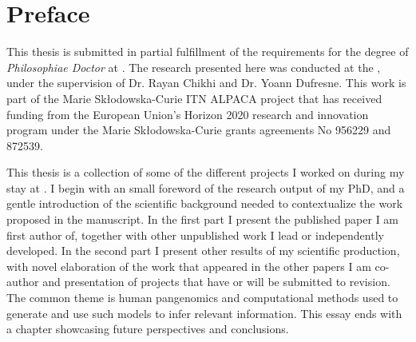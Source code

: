 \chapter{Preface}
This thesis is submitted in partial fulfillment of the requirements for the degree of \emph{Philosophiae Doctor} at \sorbonne.
The research presented here was conducted at the \pasteur, under the supervision of Dr. Rayan Chikhi and Dr. Yoann Dufresne.
This work is part of the Marie Skłodowska-Curie ITN ALPACA project that has received funding from the European Union’s Horizon 2020 research and innovation program under the Marie Skłodowska-Curie grants agreements No \num{956229} and \num{872539}.

This thesis is a collection of some of the different projects I worked on during my stay at \pasteur. I begin with an small foreword of the research output of my PhD, and a gentle introduction of the scientific background needed to contextualize the work proposed in the manuscript. In the first part I present the published paper I am first author of, together with other unpublished work I lead or independently developed. In the second part I present other results of my scientific production, with novel elaboration of the work that appeared in the other papers I am co-author and presentation of projects that have or will be submitted to revision.
The common theme is human pangenomics and computational methods used to generate and use such models to infer relevant information.  
This essay ends with a chapter showcasing future perspectives and conclusions.

